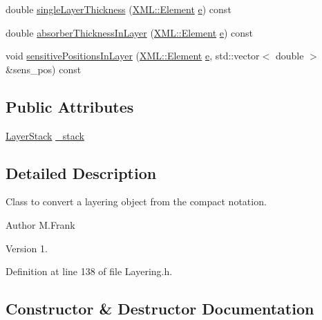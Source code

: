 \begin{DoxyCompactItemize}
double \hyperlink{class_d_d4hep_1_1_layering_a973041c54f6bea2f75556a2021610043}{single\+Layer\+Thickness} (\hyperlink{class_d_d4hep_1_1_x_m_l_1_1_element}{X\+M\+L\+::\+Element} \hyperlink{_volumes_8cpp_a8a9a1f93e9b09afccaec215310e64142}{e}) const
\item 
double \hyperlink{class_d_d4hep_1_1_layering_a799c3bb87ce9ffae950fde38ec87d55c}{absorber\+Thickness\+In\+Layer} (\hyperlink{class_d_d4hep_1_1_x_m_l_1_1_element}{X\+M\+L\+::\+Element} \hyperlink{_volumes_8cpp_a8a9a1f93e9b09afccaec215310e64142}{e}) const
\item 
void \hyperlink{class_d_d4hep_1_1_layering_aa2bc4598151a84dc5ccdd0b09a5de6b3}{sensitive\+Positions\+In\+Layer} (\hyperlink{class_d_d4hep_1_1_x_m_l_1_1_element}{X\+M\+L\+::\+Element} \hyperlink{_volumes_8cpp_a8a9a1f93e9b09afccaec215310e64142}{e}, std\+::vector$<$ double $>$ \&sens\+\_\+pos) const
\end{DoxyCompactItemize}
\subsection*{Public Attributes}
\begin{DoxyCompactItemize}
\item 
\hyperlink{class_d_d4hep_1_1_layer_stack}{Layer\+Stack} \hyperlink{class_d_d4hep_1_1_layering_a3abc06c9a003b7e5cb163660652a6318}{\+\_\+stack}
\end{DoxyCompactItemize}


\subsection{Detailed Description}
Class to convert a layering object from the compact notation. 

\begin{DoxyAuthor}{Author}
M.\+Frank 
\end{DoxyAuthor}
\begin{DoxyVersion}{Version}
1. 
\end{DoxyVersion}


Definition at line 138 of file Layering.\+h.



\subsection{Constructor \& Destructor Documentation}
\hypertarget{class_d_d4hep_1_1_layering_aece09b62f4026ce23f6077fb677458ea}{}\label{class_d_d4hep_1_1_layering_aece09b62f4026ce23f6077fb677458ea} 
